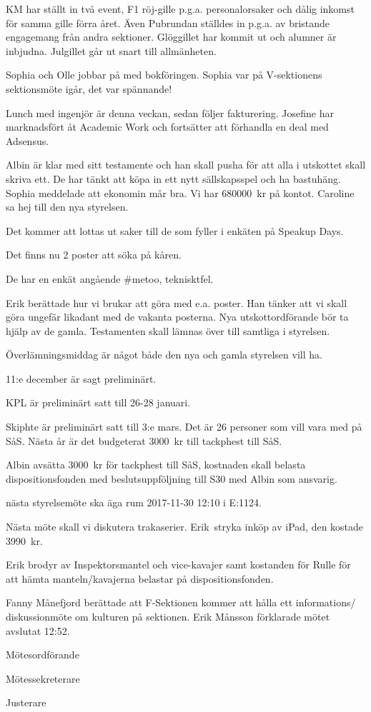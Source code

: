 \documentclass[10pt]{article}
\def\mo{Erik Månsson}
\def\ms{Johan Karlberg}
\def\ji{Daniel Bakic}
\begin{document}
\begin{paragrafer}
\begin{paragrafer}
KM har ställt in två event, F1 röj-gille p.g.a. personalorsaker och dålig inkomst för samma gille förra året. Även Pubrundan ställdes in p.g.a. av bristande engagemang från andra sektioner. Glöggillet har kommit ut och alumner är inbjudna. Julgillet går ut snart till allmänheten.

Sophia och Olle jobbar på med bokföringen.
Sophia var på V-sektionens sektionsmöte igår, det var spännande!

Lunch med ingenjör är denna veckan, sedan följer fakturering. Josefine har marknadsfört åt Academic Work och fortsätter att förhandla en deal med Adsensus.

Albin är klar med sitt testamente och han skall pusha för att alla i utskottet skall skriva ett. De har tänkt att köpa in ett nytt sällskapsspel och ha bastuhäng.
Sophia meddelade att ekonomin mår bra. Vi har \SI{680000}{kr} på kontot.
Caroline sa hej till den nya styrelsen.

Det kommer att lottas ut saker till de som fyller i enkäten på Speakup Days.

Det finns nu 2 poster att söka på kåren.

De har en enkät angående \#metoo, teknisktfel.
\end{paragrafer}

Erik berättade hur vi brukar att göra med e.a. poster. Han tänker att vi skall göra ungefär likadant med de vakanta posterna. Nya utskottordförande bör ta hjälp av de gamla.
Testamenten skall lämnas över till samtliga i styrelsen.

Överlämningsmiddag är något både den nya och gamla styrelsen vill ha.

11:e december är sagt preliminärt.

KPL är preliminärt satt till 26-28 januari.

Skiphte är preliminärt satt till 3:e mars.
Det är 26 personer som vill vara med på SåS. Nästa år är det budgeterat \SI{3000}{kr} till tackphest till SåS.

Albin \ypa avsätta \SI{3000}{kr} för tackphest till SåS, kostnaden skall belasta dispositionsfonden med beslutsuppföljning till S30 med Albin som ansvarig.

{\Mba} nästa styrelsemöte ska äga rum 2017-11-30 12:10 i E:1124.

Nästa möte skall vi diskutera trakaserier.
Erik \ypa stryka inköp av iPad, den kostade \SI{3990}{kr}.

\Mbaby

Erik \ypa brodyr av Inspektorsmantel och vice-kavajer samt kostanden för Rulle för att hämta manteln/kavajerna belastar på dispositionsfonden.

\Mbaby
{}
Fanny Månefjord berättade att F-Sektionen kommer att hålla ett informations/ diskussionmöte om kulturen på sektionen.
{\mo} förklarade mötet avslutat 12:52.

\end{paragrafer}

\newpage
\hidesignfoot
\begin{signatures}{3}
\signature{\mo}{Mötesordförande}
\signature{\ms}{Mötessekreterare}
\signature{\ji}{Justerare}
\end{signatures}
\end{document}

